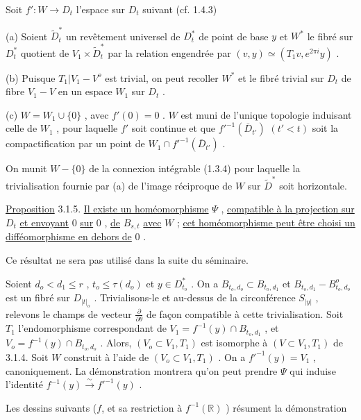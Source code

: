 Soit $f' : W \longrightarrow D_t$ l'espace sur $D_t$ suivant (cf. 1.4.3)

(a) Soient $\widetilde{D}_t^*$ un revêtement universel de $D_t^*$ de point de base $y$ et $W^*$ le fibré sur $D_t^*$ quotient de $V_1 \times \widetilde{D}_t^*$ par la relation engendrée par $(v, y) \simeq (T_1 v, e^{2\pi i} y)$ .

(b) Puisque $T_1 | V_1 - V^o$ est trivial, on peut recoller $W^*$ et le fibré trivial sur $D_t$ de fibre $V_1 - V$ en un espace $W_1$ sur $D_t$ .

(c) $W = W_1 \cup \{0\}$ , avec $f'(0) = 0$ . $W$ est muni de l'unique topologie induisant celle de $W_1$ , pour laquelle $f'$ soit continue et que ${f'}^{-1}(\bar{D}_{t'})$ $(t' < t)$ soit la compactification par un point de $W_1 \cap {f'}^{-1}(\bar{D}_{t'})$ .

On munit $W - \{0\}$ de la connexion intégrable (1.3.4) pour laquelle la trivialisation fournie par (a) de l'image réciproque de $W$ sur $\widetilde{D}^*$ soit horizontale.

\underline{Proposition} 3.1.5. \underline{Il existe un homéomorphisme} $\Psi$ , \underline{compatible à la projection sur} $D_t$ \underline{et envoyant} $0$ \underline{sur} $0$ , \underline{de} $B_{s,t}$ \underline{avec} $W$ ; \underline{cet homéomorphisme peut être choisi un difféomorphisme en dehors de} $0$ .

Ce résultat ne sera pas utilisé dans la suite du séminaire.

Soient $d_o < d_1 \leq r$ , $t_o \leq \tau(d_o)$ et $y \in D_{t_o}^*$ . On a $B_{t_o,d_o} \subset B_{t_o, d_1}$ et $B_{t_o,d_1} - B_{t_o,d_o}^o$ est un fibré sur $D_{|t|_o}$ . Trivialisons-le et au-dessus de la circonférence $S_{|y|}$ , relevons le champs de vecteur $\frac{\partial}{\partial \theta}$ de façon compatible à cette trivialisation. Soit $T_1$ l'endomorphisme correspondant de $V_1 = f^{-1}(y) \cap B_{t_o,d_1}$ , et $V_o = f^{-1}(y) \cap B_{t_o,d_o}$ . Alors, $(V_o \subset V_1, T_1)$ est isomorphe à $(V \subset V_1, T_1)$ de 3.1.4. Soit $W$ construit à l'aide de $(V_o \subset V_1, T_1)$ . On a ${f'}^{-1}(y) = V_1$ , canoniquement. La démonstration montrera qu'on peut prendre $\Psi$ qui induise l'identité $f^{-1}(y) \xrightarrow{\sim} {f'}^{-1}(y)$ .

Les dessins suivants ($f$, et sa restriction à $f^{-1}(\mathbb{R})$ ) résument la démonstration



